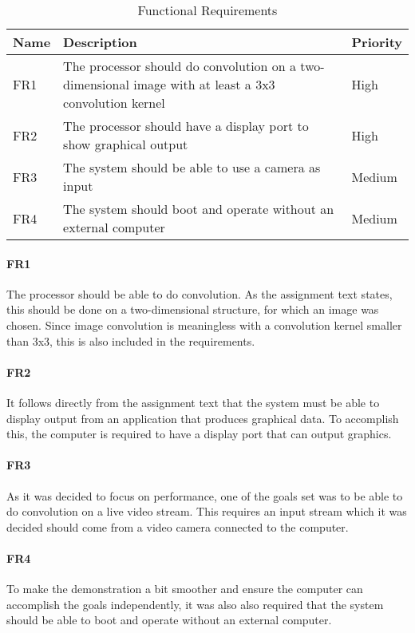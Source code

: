 \begin{table}[h]
    \centering
    \begin{tabular}{lp{12cm}l}
        Name & Description & Priority \\
        \hline
        FR1 &
            The processor should do convolution on a two-dimensional image with at least a 3x3 convolution kernel &
            High \\
        FR2 &
            The processor should have a display port to show graphical output &
            High \\
        FR3 &
            The system should be able to use a camera as input &
            Medium \\
        FR4 &
            The system should boot and operate without an external computer &
            Medium
    \end{tabular}
    \caption{Functional Requirements}
    \label{tab:FunctionalRequirements}
\end{table}

\paragraph{FR1}
The processor should be able to do convolution.
As the assignment text states, this should be done on a two-dimensional structure, for which an image was chosen.
Since image convolution is meaningless with a convolution kernel smaller than 3x3,
this is also included in the requirements.

\paragraph{FR2}
It follows directly from the assignment text that the system must be able to display output from an application that produces graphical data.
To accomplish this, the computer is required to have a display port that can output graphics.

\paragraph{FR3}
As it was decided to focus on performance, one of the goals set was to be able to do convolution on a live video stream.
This requires an input stream which it was decided should come from a video camera connected to the computer.

\paragraph{FR4}
To make the demonstration a bit smoother and ensure the computer can accomplish the goals independently, it was also also required that the system should be able to boot and operate without an external computer.

